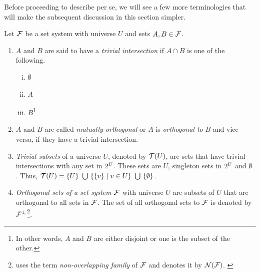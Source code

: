 Before proceeding to describe \PQRtree per se, we will see a few more
terminologies that will make the subsequent discussion in this section
simpler.

\begin{definition}
  \label{def:orthosets}%
  Let ${\cal F}$ be a set system with universe $U$ and sets $A, B \in {\cal F}$.
  \begin{enumerate}
  \item $A$ and $B$ are said to have a {\em trivial intersection} if
    $A \cap B$ is one of the following.
    \begin{enumerate}[i.]
    \singlespacing
    \item $\emptyset$
    \item $A$
    \item $B$\footnote{In other words, $A$ and $B$ are either disjoint
        or one is the subset of the other.}
    \end{enumerate}

  \item $A$ and $B$ are called {\em mutually orthogonal} or $A$ is {\em
      orthogonal to} $B$ and vice versa, if they have a trivial
    intersection.

  \item {\em Trivial subsets} of a universe $U$, denoted by ${\cal T}(U)$,
    are sets that have trivial intersections with any set in
    $2^{U}$. These sets are $U$, singleton sets in
    $2^{U}$ and $\emptyset$ \cite{n89, mm96}.
    Thus, ${\cal T}(U) = \{U\} \  \bigcup \  \{ \{v\} \mid v \in U \} \  \bigcup \
    \{\emptyset\}$.

  \item {\em Orthogonal sets of a set system} ${\cal F}$ with universe $U$
    are subsets of $U$ that are orthogonal to all sets in ${\cal F}$. The
    set of all orthogonal sets to ${\cal F}$ is denoted by
    ${\cal F}^{\bot}$\footnote{\cite[Def.~3.1]{mcc04} uses the term {\em non-overlapping
    family} of ${\cal F}$ and denotes it by ${\cal N}({\cal F})$. \label{mcc1}}.


\end{enumerate}
\end{definition}

